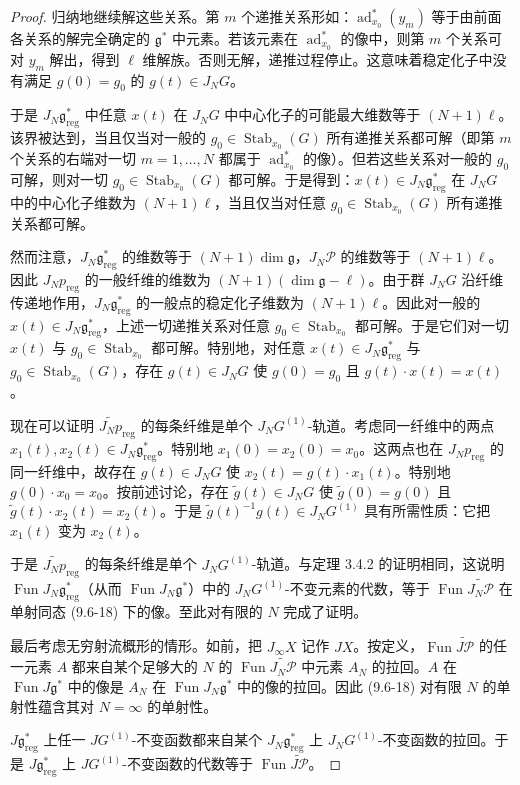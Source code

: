 \begin{proof}
    归纳地继续解这些关系。第 $m$ 个递推关系形如：$\operatorname{ad}^*_{x_0}(y_m)$ 等于由前面各关系的解完全确定的 $\mathfrak{g}^*$ 中元素。若该元素在 $\operatorname{ad}^*_{x_0}$ 的像中，则第 $m$ 个关系可对 $y_m$ 解出，得到 $\ell$ 维解族。否则无解，递推过程停止。这意味着稳定化子中没有满足 $g(0)=g_0$ 的 $g(t)\in J_NG$。

    于是 $J_N\mathfrak{g}^*_{\mathrm{reg}}$ 中任意 $x(t)$ 在 $J_NG$ 中中心化子的可能最大维数等于 $(N+1)\ell$。该界被达到，当且仅当对一般的 $g_0\in\operatorname{Stab}_{x_0}(G)$ 所有递推关系都可解（即第 $m$ 个关系的右端对一切 $m=1,\dots,N$ 都属于 $\operatorname{ad}^*_{x_0}$ 的像）。但若这些关系对一般的 $g_0$ 可解，则对一切 $g_0\in\operatorname{Stab}_{x_0}(G)$ 都可解。于是得到：$x(t)\in J_N\mathfrak{g}^*_{\mathrm{reg}}$ 在 $J_NG$ 中的中心化子维数为 $(N+1)\ell$，当且仅当对任意 $g_0\in\operatorname{Stab}_{x_0}(G)$ 所有递推关系都可解。

    然而注意，$J_N\mathfrak{g}^*_{\mathrm{reg}}$ 的维数等于 $(N+1)\dim\mathfrak{g}$，$J_N\mathcal{P}$ 的维数等于 $(N+1)\ell$。因此 $J_Np_{\mathrm{reg}}$ 的一般纤维的维数为 $(N+1)(\dim\mathfrak{g}-\ell)$。由于群 $J_NG$ 沿纤维传递地作用，$J_N\mathfrak{g}^*_{\mathrm{reg}}$ 的一般点的稳定化子维数为 $(N+1)\ell$。因此对一般的 $x(t)\in J_N\mathfrak{g}^*_{\mathrm{reg}}$，上述一切递推关系对任意 $g_0\in\operatorname{Stab}_{x_0}$ 都可解。于是它们对一切 $x(t)$ 与 $g_0\in\operatorname{Stab}_{x_0}$ 都可解。特别地，对任意 $x(t)\in J_N\mathfrak{g}^*_{\mathrm{reg}}$ 与 $g_0\in\operatorname{Stab}_{x_0}(G)$，存在 $g(t)\in J_NG$ 使 $g(0)=g_0$ 且 $g(t)\cdot x(t)=x(t)$。

    现在可以证明 $\widetilde{J_Np}_{\mathrm{reg}}$ 的每条纤维是单个 $J_NG^{(1)}$-轨道。考虑同一纤维中的两点 $x_1(t),x_2(t)\in J_N\mathfrak{g}^*_{\mathrm{reg}}$。特别地 $x_1(0)=x_2(0)=x_0$。这两点也在 $J_Np_{\mathrm{reg}}$ 的同一纤维中，故存在 $g(t)\in J_NG$ 使 $x_2(t)=g(t)\cdot x_1(t)$。特别地 $g(0)\cdot x_0=x_0$。按前述讨论，存在 $\tilde{g}(t)\in J_NG$ 使 $\tilde{g}(0)=g(0)$ 且 $\tilde{g}(t)\cdot x_2(t)=x_2(t)$。于是 $\tilde{g}(t)^{-1}g(t)\in J_NG^{(1)}$ 具有所需性质：它把 $x_1(t)$ 变为 $x_2(t)$。

    于是 $\widetilde{J_Np}_{\mathrm{reg}}$ 的每条纤维是单个 $J_NG^{(1)}$-轨道。与定理 3.4.2 的证明相同，这说明 $\operatorname{Fun}J_N\mathfrak{g}^*_{\mathrm{reg}}$（从而 $\operatorname{Fun}J_N\mathfrak{g}^*$）中的 $J_NG^{(1)}$-不变元素的代数，等于 $\operatorname{Fun}\widetilde{J_N\mathcal{P}}$ 在单射同态 (9.6-18) 下的像。至此对有限的 $N$ 完成了证明。

    最后考虑无穷射流概形的情形。如前，把 $J_\infty X$ 记作 $JX$。按定义，$\operatorname{Fun}\widetilde{J\mathcal{P}}$ 的任一元素 $A$ 都来自某个足够大的 $N$ 的 $\operatorname{Fun}\widetilde{J_N\mathcal{P}}$ 中元素 $A_N$ 的拉回。$A$ 在 $\operatorname{Fun}J\mathfrak{g}^*$ 中的像是 $A_N$ 在 $\operatorname{Fun}J_N\mathfrak{g}^*$ 中的像的拉回。因此 (9.6-18) 对有限 $N$ 的单射性蕴含其对 $N=\infty$ 的单射性。

    $J\mathfrak{g}^*_{\mathrm{reg}}$ 上任一 $JG^{(1)}$-不变函数都来自某个 $J_N\mathfrak{g}^*_{\mathrm{reg}}$ 上 $J_NG^{(1)}$-不变函数的拉回。于是 $J\mathfrak{g}^*_{\mathrm{reg}}$ 上 $JG^{(1)}$-不变函数的代数等于 $\operatorname{Fun}\widetilde{J\mathcal{P}}$。
\end{proof}

